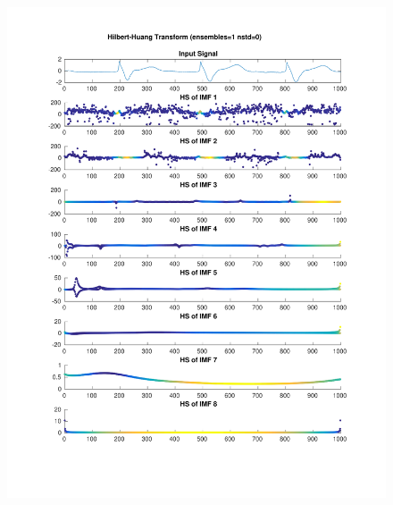 \documentclass{beamer}
\begin{document}
\begin{frame}
\begin{columns}
\begin{figure}
\includegraphics[width=\textwidth]{fig/217l1_hht.pdf}
\end{figure}
\end{columns}
\end{frame}


\end{document}
